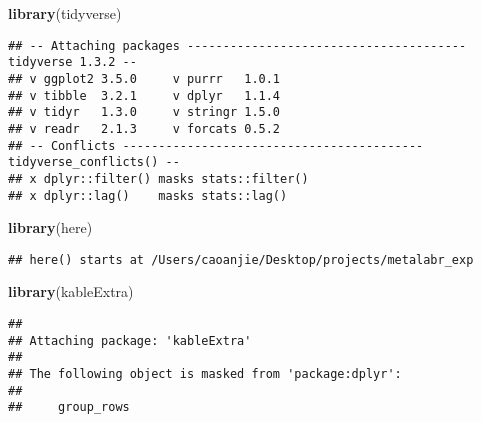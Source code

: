 \documentclass[
]{article}
\author{}
\date{\vspace{-2.5em}}
\newenvironment{Shaded}{\begin{snugshade}}{\end{snugshade}}
\newcommand{\FunctionTok}[1]{\textcolor[rgb]{0.13,0.29,0.53}{\textbf{#1}}}
\newcommand{\NormalTok}[1]{#1}
\begin{document}
\begin{Shaded}
\begin{Highlighting}[]
\FunctionTok{library}\NormalTok{(tidyverse)}
\end{Highlighting}
\end{Shaded}

\begin{verbatim}
## -- Attaching packages --------------------------------------- tidyverse 1.3.2 --
## v ggplot2 3.5.0     v purrr   1.0.1
## v tibble  3.2.1     v dplyr   1.1.4
## v tidyr   1.3.0     v stringr 1.5.0
## v readr   2.1.3     v forcats 0.5.2
## -- Conflicts ------------------------------------------ tidyverse_conflicts() --
## x dplyr::filter() masks stats::filter()
## x dplyr::lag()    masks stats::lag()
\end{verbatim}

\begin{Shaded}
\begin{Highlighting}[]
\FunctionTok{library}\NormalTok{(here)}
\end{Highlighting}
\end{Shaded}

\begin{verbatim}
## here() starts at /Users/caoanjie/Desktop/projects/metalabr_exp
\end{verbatim}

\begin{Shaded}
\begin{Highlighting}[]
\FunctionTok{library}\NormalTok{(kableExtra)}
\end{Highlighting}
\end{Shaded}

\begin{verbatim}
## 
## Attaching package: 'kableExtra'
## 
## The following object is masked from 'package:dplyr':
## 
##     group_rows
\end{verbatim}
\end{document}
